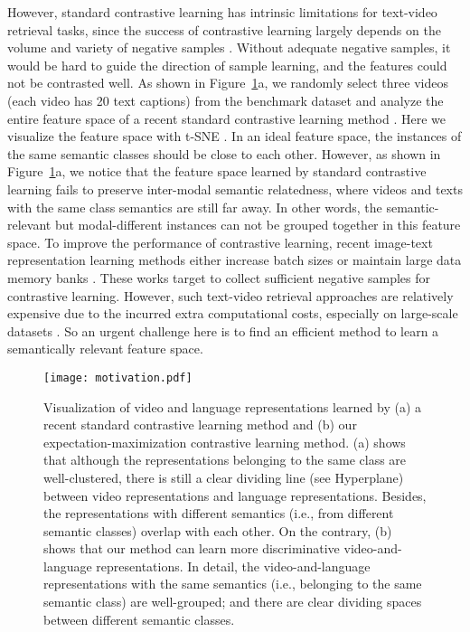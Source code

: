 \documentclass{article}
\begin{document}
However, standard contrastive learning has intrinsic limitations for text-video retrieval tasks, since the success of contrastive learning largely depends on the volume and variety of negative samples \cite{chen2020a}. Without adequate negative samples, it would be hard to guide the direction of sample learning, and the features could not be contrasted well. As shown in Figure~\ref{risk}a, we randomly select three videos (each video has 20 text captions) from the benchmark dataset \cite{xu2016msr} and analyze the entire feature space of a recent standard contrastive learning method \cite{gabeur2020multi}. Here we visualize the feature space with t-SNE \cite{maaten2014accelerating}. In an ideal feature space, the instances of the same semantic classes should be close to each other. However, as shown in Figure~\ref{risk}a, we notice that the feature space learned by standard contrastive learning fails to preserve inter-modal semantic relatedness, where videos and texts with the same class semantics are still far away. In other words, the semantic-relevant but modal-different instances can not be grouped together in this feature space. To improve the performance of contrastive learning, recent image-text representation learning methods either increase batch sizes or maintain large data memory banks \cite{chen2020a,chen2021an,misra2020self,wu2018unsupervised,he2020momentum}. These works target to collect sufficient negative samples for contrastive learning. However, such text-video retrieval approaches are relatively expensive due to the incurred extra computational costs, especially on large-scale datasets \cite{sun2019videobert}. So an urgent challenge here is to find an efficient method to learn a semantically relevant feature space. 
 
 \begin{figure}[tbp]
\centering
\texttt{[image: motivation.pdf]}
\caption{
Visualization of video and language representations learned by (a) a recent standard contrastive learning method \cite{gabeur2020multi} and (b) our expectation-maximization contrastive learning method. 
(a) shows that although the representations belonging to the same class are well-clustered, there is still a clear dividing line (see Hyperplane) between video representations and language representations. Besides, the representations with different semantics (i.e., from different semantic classes) overlap with each other. On the contrary, (b) shows that our method can learn more discriminative video-and-language representations. In detail, the video-and-language representations with the same semantics (i.e., belonging to the same semantic class) are well-grouped; and there are clear dividing spaces between different semantic classes.
}
\vspace{-1.0em}
\label{risk}
\end{figure}
\end{document}
